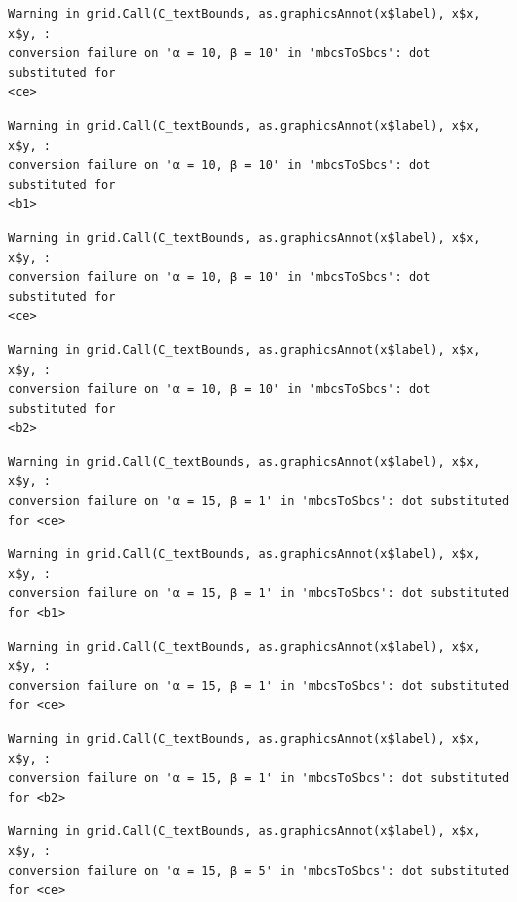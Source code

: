 \documentclass[
  spanish,
  a4paper,
]{scrreport}
\theoremstyle{plain}
\theoremstyle{definition}
\theoremstyle{definition}
\theoremstyle{remark}
\begin{document}
\begin{verbatim}
Warning in grid.Call(C_textBounds, as.graphicsAnnot(x$label), x$x, x$y, :
conversion failure on 'α = 10, β = 10' in 'mbcsToSbcs': dot substituted for
<ce>
\end{verbatim}

\begin{verbatim}
Warning in grid.Call(C_textBounds, as.graphicsAnnot(x$label), x$x, x$y, :
conversion failure on 'α = 10, β = 10' in 'mbcsToSbcs': dot substituted for
<b1>
\end{verbatim}

\begin{verbatim}
Warning in grid.Call(C_textBounds, as.graphicsAnnot(x$label), x$x, x$y, :
conversion failure on 'α = 10, β = 10' in 'mbcsToSbcs': dot substituted for
<ce>
\end{verbatim}

\begin{verbatim}
Warning in grid.Call(C_textBounds, as.graphicsAnnot(x$label), x$x, x$y, :
conversion failure on 'α = 10, β = 10' in 'mbcsToSbcs': dot substituted for
<b2>
\end{verbatim}

\begin{verbatim}
Warning in grid.Call(C_textBounds, as.graphicsAnnot(x$label), x$x, x$y, :
conversion failure on 'α = 15, β = 1' in 'mbcsToSbcs': dot substituted for <ce>
\end{verbatim}

\begin{verbatim}
Warning in grid.Call(C_textBounds, as.graphicsAnnot(x$label), x$x, x$y, :
conversion failure on 'α = 15, β = 1' in 'mbcsToSbcs': dot substituted for <b1>
\end{verbatim}

\begin{verbatim}
Warning in grid.Call(C_textBounds, as.graphicsAnnot(x$label), x$x, x$y, :
conversion failure on 'α = 15, β = 1' in 'mbcsToSbcs': dot substituted for <ce>
\end{verbatim}

\begin{verbatim}
Warning in grid.Call(C_textBounds, as.graphicsAnnot(x$label), x$x, x$y, :
conversion failure on 'α = 15, β = 1' in 'mbcsToSbcs': dot substituted for <b2>
\end{verbatim}

\begin{verbatim}
Warning in grid.Call(C_textBounds, as.graphicsAnnot(x$label), x$x, x$y, :
conversion failure on 'α = 15, β = 5' in 'mbcsToSbcs': dot substituted for <ce>
\end{verbatim}
\end{document}
